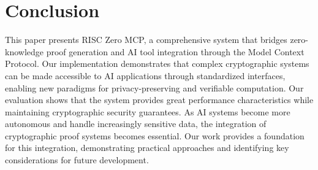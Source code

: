 \documentclass[11pt]{article}
\begin{document}
\section{Conclusion}
\label{sec:conclusion}

This paper presents RISC Zero MCP, a comprehensive system that bridges zero-knowledge proof generation and AI tool integration through the Model Context Protocol. Our implementation demonstrates that complex cryptographic systems can be made accessible to AI applications through standardized interfaces, enabling new paradigms for privacy-preserving and verifiable computation. Our evaluation shows that the system provides great performance characteristics while maintaining cryptographic security guarantees. As AI systems become more autonomous and handle increasingly sensitive data, the integration of cryptographic proof systems becomes essential. Our work provides a foundation for this integration, demonstrating practical approaches and identifying key considerations for future development.
\end{document}
